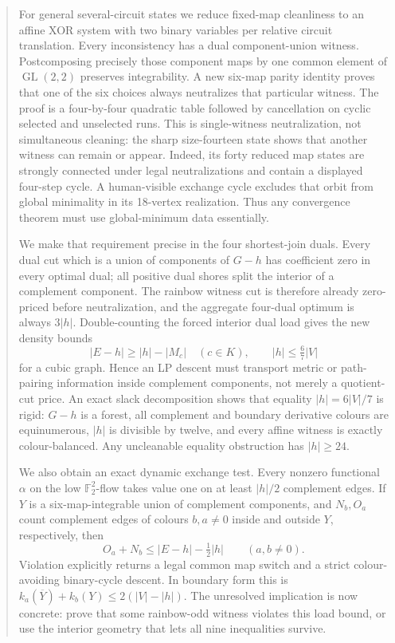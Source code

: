 \documentclass[11pt]{article}
\theoremstyle{definition}
\theoremstyle{remark}
\newcommand{\F}{\mathbb F}
\begin{document}
\begin{abstract}
For general several-circuit states we reduce fixed-map cleanliness to an
affine XOR system with two binary variables per relative circuit
translation.  Every inconsistency has a dual component-union witness.
Postcomposing precisely those component maps by one common element of
\(\operatorname{GL}(2,2)\) preserves integrability.  A new six-map parity
identity proves that one of the six choices always neutralizes that
particular witness.  The proof is a four-by-four quadratic table followed
by cancellation on cyclic selected and unselected runs.  This is
single-witness neutralization, not simultaneous cleaning: the sharp
size-fourteen state shows that another witness can remain or appear.
Indeed, its forty reduced map states are strongly connected under legal
neutralizations and contain a displayed four-step cycle.  A human-visible
exchange cycle excludes that orbit from global minimality in its
18-vertex realization.  Thus any convergence theorem must use
global-minimum data essentially.

We make that requirement precise in the four shortest-join duals.
Every dual cut which is a union of components of \(G-h\) has coefficient
zero in every optimal dual; all positive dual shores split the interior
of a complement component.  The rainbow witness cut is therefore already
zero-priced before neutralization, and the aggregate four-dual optimum is
always \(3|h|\).  Double-counting the forced interior dual load gives the
new density bounds
\[
                 |E-h|\ge |h|-|M_c|\quad(c\in K),\qquad
                 |h|\le\tfrac67|V|
\]
for a cubic graph.  Hence an LP descent must transport metric or
path-pairing information inside complement components, not merely a
quotient-cut price.
An exact slack decomposition shows that equality
\(|h|=6|V|/7\) is rigid: \(G-h\) is a forest, all complement and
boundary derivative colours are equinumerous, \(|h|\) is divisible by
twelve, and every affine witness is exactly colour-balanced.  Any
uncleanable equality obstruction has \(|h|\ge24\).

We also obtain an exact dynamic exchange test.  Every nonzero functional
\(\alpha\) on the low \(\F_2^2\)-flow takes value one on at least
\(|h|/2\) complement edges.  If \(Y\) is a six-map-integrable union of
complement components, and \(N_b,O_a\) count complement edges of colours
\(b,a\ne0\) inside and outside \(Y\), respectively, then
\[
                 O_a+N_b\le |E-h|-\tfrac12|h|
                 \qquad(a,b\ne0).
\]
Violation explicitly returns a legal common map switch and a strict
colour-avoiding binary-cycle descent.  In boundary form this is
\(k_a(\overline Y)+k_b(Y)\le2(|V|-|h|)\).  The unresolved implication is
now concrete: prove that some rainbow-odd witness violates this load
bound, or use the interior geometry that lets all nine inequalities
survive.


\end{abstract}
\end{document}
